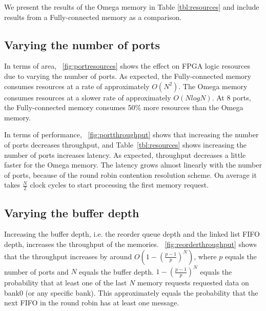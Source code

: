 We present the results of the Omega memory in Table \ref{tbl:resources} and include results from a Fully-connected memory as a comparison.
\subsection{Varying the number of ports}
In terms of area, \figurename~\ref{fig:portresources} shows the effect on FPGA logic resources due to varying the number of ports. As expected, the Fully-connected memory consumes resources at a rate of approximately $O(N^2)$. The Omega memory consumes resources at a slower rate of approximately $O(NlogN)$. At 8 ports, the Fully-connected memory consumes 50\% more resources than the Omega memory.\par
In terms of performance, \figurename~\ref{fig:portthroughput} shows that increasing the number of ports decreases throughput, and Table~\ref{tbl:resources} shows increasing the number of ports increases latency. As expected, throughput decreases a little faster for the Omega memory. The latency grows almost linearly with the number of ports, because of the round robin contention resolution scheme. On average it takes $\frac{N}{2}$ clock cycles to start processing the first memory request.

\subsection{Varying the buffer depth} Increasing the buffer depth, i.e. the reorder queue depth and the linked list FIFO depth, increases the throughput of the memories. \figurename~\ref{fig:reorderthroughput} shows that the throughput increases by around $O(1-(\frac{p-1}{p})^N)$, where $p$ equals the number of ports and $N$ equals the buffer depth. $1-(\frac{p-1}{p})^N$ equals the probability that at least one of the last $N$ memory requests requested data on bank0 (or any specific bank). This approximately equals the probability that the next FIFO in the round robin has at least one message.


